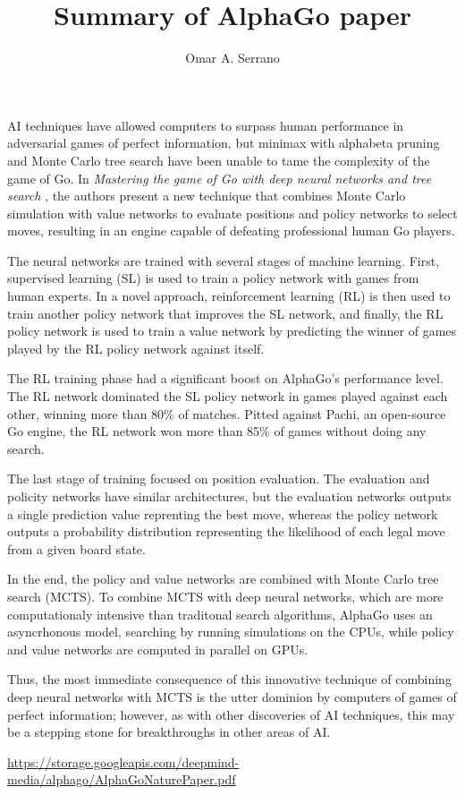\documentclass[10pt,a4paper]{article}
\title{Summary of AlphaGo paper}
\author{Omar A. Serrano}
\begin{document}
\maketitle

AI techniques have allowed computers to surpass human performance in adversarial
games of perfect information, but minimax with alphabeta pruning and Monte Carlo
tree search have been unable to tame the complexity of the game of Go. In
\textit{Mastering the game of Go with deep neural networks and tree search}
\cite{1}, the authors present a new technique that combines Monte Carlo
simulation with value networks to evaluate positions and policy networks to
select moves, resulting in an engine capable of defeating professional human Go
players.

The neural networks are trained with several stages of machine learning. First,
supervised learning (SL) is used to train a policy network with games from human
experts. In a novel approach, reinforcement learning (RL) is then used to train
another policy network that improves the SL network, and finally, the RL policy
network is used to train a value network by predicting the winner of games
played by the RL policy network against itself.

The RL training phase had a significant boost on AlphaGo's performance level.
The RL network dominated the SL policy network in games played against each
other, winning more than 80\% of matches. Pitted against Pachi, an open-source
Go engine, the RL network won more than 85\% of games without doing any search.

The last stage of training focused on position evaluation. The evaluation and
policity networks have similar architectures, but the evaluation networks
outputs a single prediction value reprenting the best move, whereas the policy
network outputs a probability distribution representing the likelihood of each
legal move from a given board state.

In the end, the policy and value networks are combined with Monte Carlo tree
search (MCTS). To combine MCTS with deep neural networks, which are more
computationaly intensive than traditonal search algorithms, AlphaGo uses an
asyncrhonous model, searching by running simulations on the CPUs, while policy
and value networks are computed in parallel on GPUs.

Thus, the most immediate consequence of this innovative technique of combining
deep neural networks with MCTS is the utter dominion by computers of games
of perfect information; however, as with other discoveries of AI techniques,
this may be a stepping stone for breakthroughs in other areas of AI.

\begin{thebibliography}{9}
 \url{https://storage.googleapis.com/deepmind-media/alphago/AlphaGoNaturePaper.pdf}
\end{thebibliography}
\end{document}
